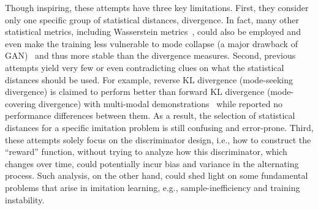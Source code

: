 Though inspiring, these attempts have three key limitations.
First, they consider only one specific group of statistical distances, divergence. 
In fact, many other statistical metrics, including Wasserstein metrics~\citep{arjovsky2017wasserstein,xiao2019wasserstein}, could also be employed and even make the training less vulnerable to mode collapse (a major drawback of GAN)~\citep{che2016mode} and thus more stable than the divergence measures. 
Second, previous attempts yield very few or even contradicting clues on what the statistical distances should be used. 
For example, reverse KL divergence (mode-seeking divergence) is claimed to perform better than forward KL divergence (mode-covering divergence) with multi-modal demonstrations~\citep{ke2019imitation} while \citet{ghasemipour2020divergence} reported no performance differences between them. 
As a result, the selection of statistical distances for a specific imitation problem is still confusing and error-prone. 
Third, these attempts solely focus on the discriminator design, i.e., how to construct the ``reward'' function, without trying to analyze how this discriminator, which changes over time, could potentially incur bias and variance in the alternating process. 
Such analysis, on the other hand, could shed light on some fundamental problems that arise in imitation learning, e.g., sample-inefficiency and training instability. 





